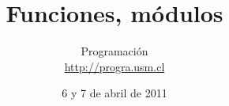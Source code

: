 \documentclass[12pt]{beamer}
\title{Funciones, módulos}
\author{
  Programación \\ \url{http://progra.usm.cl}
}
\date{6 y 7 de abril de 2011}
\begin{document}
  \begin{frame}
    \maketitle
  \end{frame}
\end{document}
